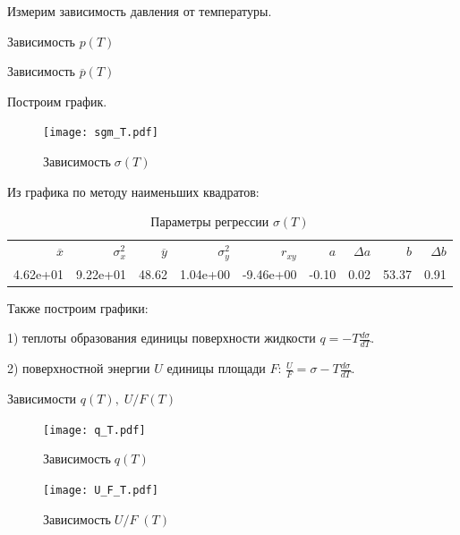 \documentclass[12pt,a4paper]{article}
\begin{document}
\newpage

		Измерим зависимость давления от температуры.
		
		\begin{table}[h]
			\caption{Зависимость $p(T)$}
				
		\end{table}
		
		\begin{table}[h]
			\caption{Зависимость $\overline{p}(T)$}
			
			
		\end{table}
		
		Построим график.
		
		\begin{figure}[H]
			\texttt{[image: sgm\_T.pdf]}
			\caption{$ \text{Зависимость} \; \sigma(T)$}
		\end{figure}
		
		
		Из графика по методу наименьших квадратов:
		
		\begin{table}[h]
			\caption{Параметры регрессии $\sigma (T)$}
			\begin{tabular}{rrrrrrrrr}
				\hline
				$\overline{x}$ & $\sigma_x^2$ & $\overline{y}$ & $\sigma_y^2$ & $r_{xy}$ & $a$ & $\Delta a$ & $b$ & $\Delta b$ \\
				4.62e+01 & 9.22e+01 & 48.62 & 1.04e+00 & -9.46e+00 & -0.10 & 0.02 & 53.37 & 0.91 \\
				\hline
			\end{tabular}
		\end{table}
	
\newpage

		Также построим графики:
		
		1) теплоты образования единицы поверхности жидкости $q = - T \frac{d\sigma}{dT}$.
		
		2) поверхностной энергии $U$ единицы площади $F$: $\frac{U}{F} = \sigma - T \frac{d\sigma}{dT}$.
		
		\begin{table}[h]
			\caption{Зависимости $q(T), \; U/F(T)$}
			
		\end{table}
				
		\begin{figure}[H]
			\texttt{[image: q\_T.pdf]}
			\caption{$ \text{Зависимость} \; q(T)$}
		\end{figure}
		
		\begin{figure}[H]
			\texttt{[image: U\_F\_T.pdf]}
			\caption{$ \text{Зависимость} \; U/F \;(T)$}
		\end{figure}
		
\end{document}
